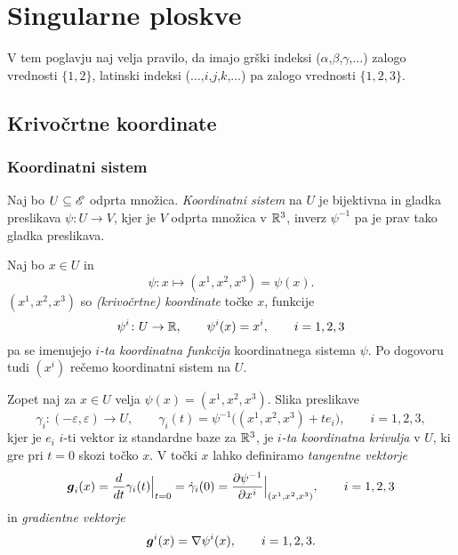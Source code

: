 \chapter{Singularne ploskve}


V tem poglavju naj velja pravilo, da imajo grški indeksi ($\alpha$,$\beta$,$\gamma$,$\dots$) zalogo
vrednosti $\{1,2\}$, latinski indeksi ($\dots$,$i$,$j$,$k$,$\dots$) pa zalogo vrednosti $\{1,2,3\}$.


\section{Krivočrtne koordinate}


\subsection{Koordinatni sistem}


\begin{definicija}
	Naj bo $U\subseteq\mathscr E$ odprta množica. \emph{Koordinatni sistem} na $U$ je bijektivna in
	gladka preslikava $\psi\colon U\to V$, kjer je $V$ odprta
	množica v $\mathbb R^3$, inverz $\psi^{-1}$ pa je prav tako gladka preslikava.
\end{definicija}

Naj bo $x\in U$ in
\[ \psi\colon x\mapsto (x^1,x^2,x^3)=\psi(x). \]
$(x^1,x^2,x^3)$ so \emph{(krivočrtne) koordinate} točke $x$, funkcije
\[ \psi^i\colon U\to\mathbb R,\qquad \psi^i(x)=x^i,\qquad i=1,2,3 \]
pa se imenujejo \emph{$i$-ta koordinatna funkcija} koordinatnega sistema $\psi$.
Po dogovoru tudi $(x^i)$ rečemo koordinatni sistem na $U$.

Zopet naj za $x\in U$ velja $\psi(x)=(x^1,x^2,x^3)$. Slika preslikave
\begin{equation} \label{e:kokri}
	\gamma_i\colon(-\varepsilon,\varepsilon)\to U,\qquad
	\gamma_i(t)=\psi^{-1}\big((x^1,x^2,x^3)+te_i\big),\qquad i=1,2,3,
\end{equation}
kjer je $e_i$ $i$-ti vektor iz standardne baze za $\mathbb R^3$,
je \emph{$i$-ta koordinatna krivulja} v $U$, ki gre pri $t=0$ skozi točko $x$.
V točki $x$ lahko definiramo \emph{tangentne vektorje}
\begin{equation} \label{e:tanvek}
	\boldsymbol g_i(x)=\frac{d}{dt}\gamma_i(t)\Big|_{t=0}=\dot{\gamma}_i(0)
	=\frac{\partial\psi^{-1}}{\partial x^i}\Big|_{(x^1,x^2,x^3)}
	, \qquad i=1,2,3
\end{equation}
in \emph{gradientne vektorje}
\begin{equation} \label{e:gradvek}
	\boldsymbol g^i(x)=\nabla\psi^i(x),\qquad i=1,2,3.
\end{equation}

